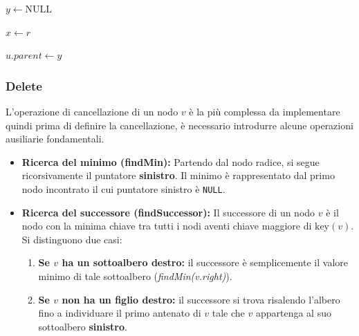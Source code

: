 \begin{algorithm}
    \caption{Inserimento in un BST}
    \label{alg:insert_bst}
    \SetAlgoLined
    \DontPrintSemicolon
    
    
    \BlankLine 
    
    $y \leftarrow \text{NULL}$ 
    
        
    $x \leftarrow r$ 
    
    
    $u.parent \leftarrow y$\;
    
\end{algorithm}


\subsubsection{Delete}

L'operazione di cancellazione di un nodo $v$ è la più complessa da implementare quindi prima di definire la cancellazione, è necessario introdurre alcune operazioni ausiliarie fondamentali.

\begin{itemize}
    \item \textbf{Ricerca del minimo (findMin):} Partendo dal nodo radice, si segue ricorsivamente il puntatore \textbf{sinistro}. Il minimo è rappresentato dal primo nodo incontrato il cui puntatore sinistro è \texttt{NULL}.
    \item \textbf{Ricerca del successore (findSuccessor):} Il successore di un nodo $v$ è il nodo con la minima chiave tra tutti i nodi aventi chiave maggiore di $\text{key}(v)$. Si distinguono due casi:
    \begin{enumerate}
        \item \textbf{Se $v$ ha un sottoalbero destro:} il successore è semplicemente il valore minimo di tale sottoalbero (\textit{findMin(v.right)}).
        \item \textbf{Se $v$ non ha un figlio destro:} il successore si trova risalendo l'albero fino a individuare il primo antenato di $v$ tale che $v$ appartenga al suo sottoalbero \textbf{sinistro}.
    \end{enumerate}
\end{itemize}


